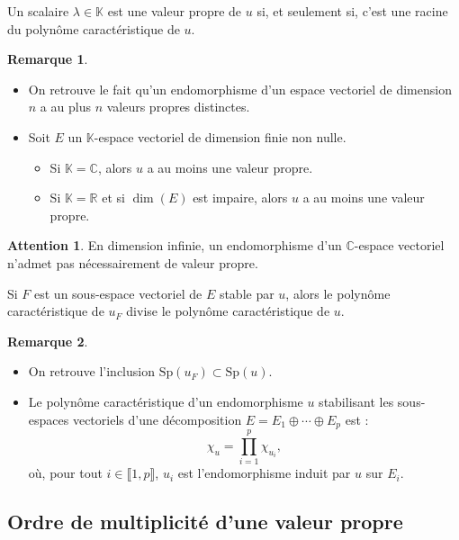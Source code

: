\documentclass[french]{article}
\newcommand{\R}{\mathbb{R}}
\newcommand{\C}{\mathbb{C}}
\newcommand{\K}{\mathbb{K}}
\newcommand{\Sp}{\text{Sp}}
\theoremstyle{plain}
\theoremstyle{definition}
\newtheorem*{rmq}{Remarque}
\newtheorem*{attention}{Attention}
\theoremstyle{remark}
\begin{document}
	\begin{prop}{}%
		Un scalaire $\lambda\in\K$ est une valeur propre de $u$ si, et seulement si, c'est une racine du polynôme caractéristique de $u$.
	\end{prop}
	
	\begin{rmq}
		\begin{itemize}
			\item On retrouve le fait qu'un endomorphisme d'un espace vectoriel de dimension $n$ a au plus $n$ valeurs propres distinctes.
			\item Soit $E$ un $\K$-espace vectoriel de dimension finie non nulle.
			\begin{itemize}[label=$\star$]
				\item Si $\K=\C$, alors $u$ a au moins une valeur propre.
				\item Si $\K=\R$ et si $\dim(E)$ est impaire, alors $u$ a au moins une valeur propre.
			\end{itemize}
		\end{itemize}
	\end{rmq}
	
	\begin{attention}
		En dimension infinie, un endomorphisme d'un $\C$-espace vectoriel n'admet pas nécessairement de valeur propre.
	\end{attention}
	
	\begin{prop}{}%
		Si $F$ est un sous-espace vectoriel de $E$ stable par $u$, alors le polynôme caractéristique de $u_F$ divise le polynôme caractéristique de $u$.
	\end{prop}
	
	\begin{rmq}
		\begin{itemize}
			\item On retrouve l'inclusion $\Sp(u_F)\subset\Sp(u)$.
			\item Le polynôme caractéristique d'un endomorphisme $u$ stabilisant les sous-espaces vectoriels d'une décomposition $E=E_1\oplus\cdots\oplus E_p$ est : $$\chi_u=\prod_{i=1}^{p}\chi_{u_i},$$ où, pour tout $i\in\llbracket1,p\rrbracket$, $u_i$ est l'endomorphisme induit par $u$ sur $E_i$.
		\end{itemize}
	\end{rmq}
	
	\subsection{Ordre de multiplicité d'une valeur propre}
	
\end{document}
